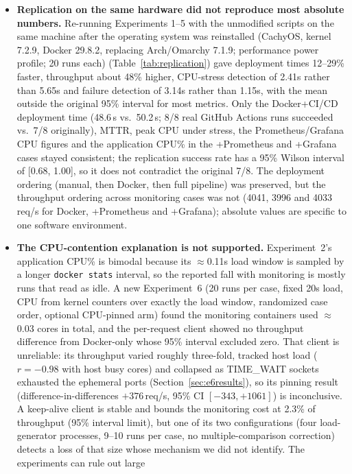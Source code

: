 \documentclass[conference]{IEEEtran}
\begin{document}
\begin{itemize}
\item \textbf{Replication on the same hardware did not reproduce most
absolute numbers.} Re-running Experiments 1--5 with the unmodified scripts on
the same machine after the operating system was reinstalled (CachyOS, kernel
7.2.9, Docker 29.8.2, replacing Arch/Omarchy 7.1.9; performance power profile;
20 runs each)
(Table~\ref{tab:replication}) gave deployment times 12--29\% faster, throughput about 48\% higher, CPU-stress
detection of 2.41s rather than 5.65s and failure detection of 3.14s rather
than 1.15s, with the mean outside the original 95\% interval for most metrics.
Only the Docker+CI/CD deployment time (48.6\,s vs.\ 50.2\,s; 8/8 real
GitHub Actions runs succeeded vs.\ 7/8 originally), MTTR, peak CPU under
stress, the Prometheus/Grafana CPU figures and the application CPU\% in the
+Prometheus and +Grafana cases stayed consistent; the replication success rate
has a 95\% Wilson interval of [0.68, 1.00], so it does not contradict the
original 7/8. The
deployment ordering (manual, then Docker, then full pipeline) was preserved,
but the throughput ordering across monitoring cases was not (4041, 3996 and
4033\,req/s for Docker, +Prometheus and +Grafana); absolute values are
specific to one software environment.
\item \textbf{The CPU-contention explanation is not supported.} Experiment~2's
application CPU\% is bimodal because its $\approx$0.11s load window is sampled
by a longer \texttt{docker stats} interval, so the reported fall with
monitoring is mostly runs that read as idle. A new Experiment~6 (20 runs per
case, fixed 20s load, CPU from kernel counters over exactly the load window,
randomized case order, optional CPU-pinned arm) found the monitoring
containers used $\approx$0.03 cores in total, and the per-request client showed
no throughput difference from Docker-only whose 95\% interval excluded zero. That
client is unreliable: its throughput varied roughly three-fold, tracked host load
($r{=}-0.98$ with host busy cores) and collapsed as TIME\_WAIT sockets exhausted
the ephemeral ports (Section~\ref{sec:e6results}), so its pinning result
(difference-in-differences $+376$\,req/s, 95\% CI $[-343, +1061]$) is
inconclusive. A keep-alive client is stable and bounds the monitoring cost at
2.3\% of throughput (95\% interval limit), but one of its two configurations (four load-generator
processes, 9--10 runs per case, no multiple-comparison correction) detects a loss of
that size whose mechanism we did not identify. The experiments can rule out large

\end{itemize}
\end{document}
